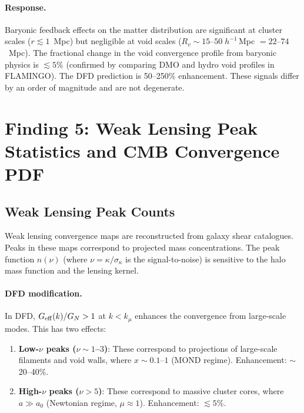 \documentclass[11pt,a4paper]{article}
\newcommand{\Geff}{G_{\rm eff}}
\begin{document}
\paragraph{Response.}
Baryonic feedback effects on the matter distribution are significant
at cluster scales ($r \lesssim 1$~Mpc) but negligible at void scales
($R_v \sim 15$--$50\;h^{-1}$\,Mpc $= 22$--$74$~Mpc).  The
fractional change in the void convergence profile from baryonic
physics is $\lesssim 5\%$ (confirmed by comparing DMO and hydro
void profiles in FLAMINGO).  The DFD prediction is 50--250\%
enhancement.  These signals differ by an order of magnitude and
are not degenerate.


\section{Finding 5: Weak Lensing Peak Statistics and CMB Convergence PDF}
\label{sec:peak-stats}

\subsection{Weak Lensing Peak Counts}

Weak lensing convergence maps are reconstructed from galaxy shear
catalogues.  Peaks in these maps correspond to projected mass
concentrations.  The peak function $n(\nu)$ (where $\nu = \kappa/
\sigma_\kappa$ is the signal-to-noise) is sensitive to the halo
mass function and the lensing kernel.

\paragraph{DFD modification.}
In DFD, $\Geff(k)/G_N > 1$ at $k < k_\mu$ enhances the convergence
from large-scale modes.  This has two effects:
\begin{enumerate}
\item \textbf{Low-$\nu$ peaks ($\nu \sim 1$--$3$)}: These correspond
  to projections of large-scale filaments and void walls, where
  $x \sim 0.1$--$1$ (MOND regime).  Enhancement: $\sim$\,20--40\%.
\item \textbf{High-$\nu$ peaks ($\nu > 5$)}: These correspond to
  massive cluster cores, where $a \gg a_0$ (Newtonian regime,
  $\mu \approx 1$).  Enhancement: $\lesssim 5\%$.
\end{enumerate}
\end{document}
